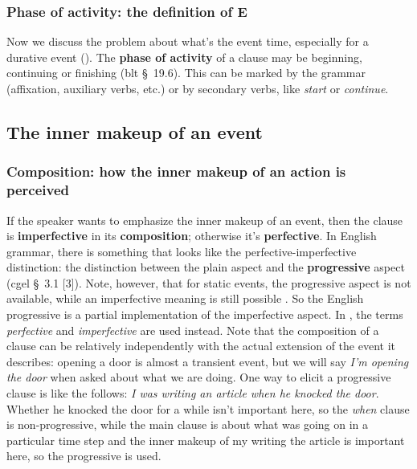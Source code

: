 \documentclass[UTF8, a4paper, oneside, scheme=plain]{ctexart}
\newcommand*{\citesec}[1]{\S~{#1}}
\newcommand*{\citepage}[1]{pp.~{#1}}
\newcommand*{\concept}[1]{\textbf{#1}}
\newcommand*{\term}[1]{\emph{#1}}
\newcommand*{\corpus}[1]{\emph{#1}}
\begin{document}
\subsubsection{Phase of activity: the definition of E}\label{sec:phase-of-activity}

Now we discuss the problem about what's the event time,
especially for a durative event ().
The \concept{phase of activity} of a clause 
may be beginning, continuing or finishing (\ac{blt} \citesec{19.6}).
This can be marked by the grammar (affixation, auxiliary verbs, etc.) 
or by secondary verbs,
like \corpus{start} or \corpus{continue}.

\subsection{The inner makeup of an event}\label{sec:inner-make-up-event}

\subsubsection{Composition: how the inner makeup of an action is perceived}\label{sec:composition}

If the speaker wants to emphasize the inner makeup of an event,
then the clause is \concept{imperfective} in its \concept{composition};
otherwise it's \concept{perfective}.
In English grammar, 
there is something that looks like the perfective-imperfective distinction:
the distinction between the plain aspect and the \concept{progressive} aspect
(\ac{cgel} \citesec{3.1} [3]).
Note, however, that for static events, 
the progressive aspect is not available,
while an imperfective meaning is still possible \citep[\citepage{124}]{cgel}.
So the English progressive is a partial implementation of the imperfective aspect.
In \cite[\citesec{2.2.3}]{dixon2005semantic},
the terms \term{perfective} and \term{imperfective} are used instead.
Note that the composition of a clause can be relatively independently 
with the actual extension of the event it describes:
opening a door is almost a transient event,
but we will say \corpus{I'm opening the door} when asked about what we are doing.
One way to elicit a progressive clause is like the follows:
\corpus{I was writing an article when he knocked the door}.
Whether he knocked the door for a while isn't important here,
so the \corpus{when} clause is non-progressive,
while the main clause is about what was going on in a particular time step
and the inner makeup of my writing the article is important here,
so the progressive is used.
\end{document}
